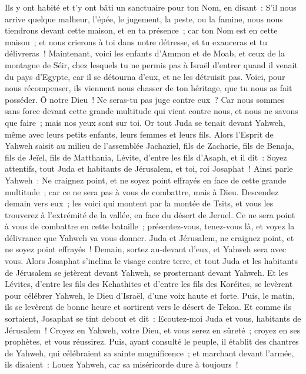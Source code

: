 \begin{multicols}{2}
Ils y ont habité et t'y ont bâti un sanctuaire pour ton Nom, en disant~:
S'il nous arrive quelque malheur, l'épée, le jugement, la peste, ou la famine, nous nous tiendrons devant cette maison, et en ta présence~; car ton Nom est en cette maison~; et nous crierons à toi dans notre détresse, et tu exauceras et tu délivreras~!
Maintenant, voici les enfants d'Ammon et de Moab, et ceux de la montagne de Séir, chez lesquels tu ne permis pas à Israël d'entrer quand il venait du pays d'Egypte, car il se détourna d'eux, et ne les détruisit pas.
Voici, pour nous récompenser, ils viennent nous chasser de ton héritage, que tu nous as fait posséder.
Ô notre Dieu~! Ne seras-tu pas juge contre eux~? Car nous sommes sans force devant cette grande multitude qui vient contre nous, et nous ne savons que faire~; mais nos yeux sont sur toi.
Or tout Juda se tenait devant Yahweh, même avec leurs petits enfants, leurs femmes et leurs fils.
Alors l'Esprit de Yahweh saisit au milieu de l'assemblée Jachaziel, fils de Zacharie, fils de Benaja, fils de Jeïel, fils de Matthania, Lévite, d'entre les fils d'Asaph,
et il dit~: Soyez attentifs, tout Juda et habitants de Jérusalem, et toi, roi Josaphat~! Ainsi parle Yahweh~: Ne craignez point, et ne soyez point effrayés en face de cette grande multitude~; car ce ne sera pas à vous de combattre, mais à Dieu.
Descendez demain vers eux~; les voici qui montent par la montée de Tsits, et vous les trouverez à l'extrémité de la vallée, en face du désert de Jeruel.
Ce ne sera point à vous de combattre en cette bataille~; présentez-vous, tenez-vous là, et voyez la délivrance que Yahweh va vous donner. Juda et Jérusalem, ne craignez point, et ne soyez point effrayés~! Demain, sortez au-devant d'eux, et Yahweh sera avec vous.
Alors Josaphat s'inclina le visage contre terre, et tout Juda et les habitants de Jérusalem se jetèrent devant Yahweh, se prosternant devant Yahweh.
Et les Lévites, d'entre les fils des Kehathites et d'entre les fils des Koréites, se levèrent pour célébrer Yahweh, le Dieu d'Israël, d'une voix haute et forte.
Puis, le matin, ils se levèrent de bonne heure et sortirent vers le désert de Tekoa. Et comme ils sortaient, Josaphat se tint debout et dit~: Ecoutez-moi Juda et vous, habitants de Jérusalem~! Croyez en Yahweh, votre Dieu, et vous serez en sûreté~; croyez en ses prophètes, et vous réussirez.
Puis, ayant consulté le peuple, il établit des chantres de Yahweh, qui célébraient sa sainte magnificence~; et marchant devant l'armée, ils disaient~: Louez Yahweh, car sa miséricorde dure à toujours~!

\end{multicols}
